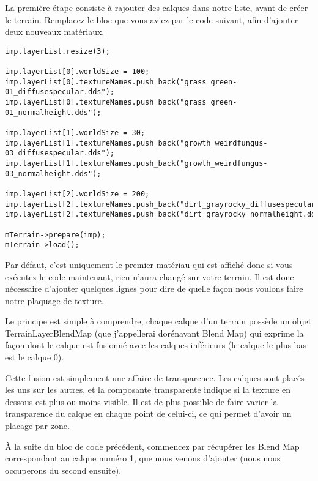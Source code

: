 La premi\`ere \'etape consiste \`a rajouter des calques dans notre liste, avant de cr\'eer le terrain. Remplacez le bloc que vous aviez par le code suivant, afin d'ajouter deux nouveaux mat\'eriaux.



\begin{lstlisting}[caption={Ajout de calques}]
imp.layerList.resize(3);

imp.layerList[0].worldSize = 100;
imp.layerList[0].textureNames.push_back("grass_green-01_diffusespecular.dds");
imp.layerList[0].textureNames.push_back("grass_green-01_normalheight.dds");

imp.layerList[1].worldSize = 30;
imp.layerList[1].textureNames.push_back("growth_weirdfungus-03_diffusespecular.dds");
imp.layerList[1].textureNames.push_back("growth_weirdfungus-03_normalheight.dds");

imp.layerList[2].worldSize = 200;
imp.layerList[2].textureNames.push_back("dirt_grayrocky_diffusespecular.dds");
imp.layerList[2].textureNames.push_back("dirt_grayrocky_normalheight.dds");

mTerrain->prepare(imp);
mTerrain->load();
\end{lstlisting}

Par d\'efaut, c'est uniquement le premier mat\'eriau qui est affich\'e donc si vous ex\'ecutez le code maintenant, rien n'aura chang\'e sur votre terrain.  Il est donc n\'ecessaire d'ajouter quelques lignes pour dire de quelle fa\c{c}on nous voulons faire notre plaquage de texture.\newline

Le principe est simple \`a comprendre, chaque calque d'un terrain poss\`ede un objet TerrainLayerBlendMap (que j'appellerai dor\'enavant Blend Map) qui exprime la fa\c{c}on dont le calque est fusionn\'e avec les calques inf\'erieurs (le calque le plus bas est le calque 0).

Cette fusion est simplement une affaire de transparence. Les calques sont plac\'es les uns sur les autres, et la composante transparente indique si la texture en dessous est plus ou moins visible. Il est de plus possible de faire varier la transparence du calque en chaque point de celui-ci, ce qui permet d'avoir un placage par zone.\newline

\`A la suite du bloc de code pr\'ec\'edent, commencez par r\'ecup\'erer les Blend Map correspondant au calque num\'ero 1, que nous venons d'ajouter (nous nous occuperons du second ensuite).


